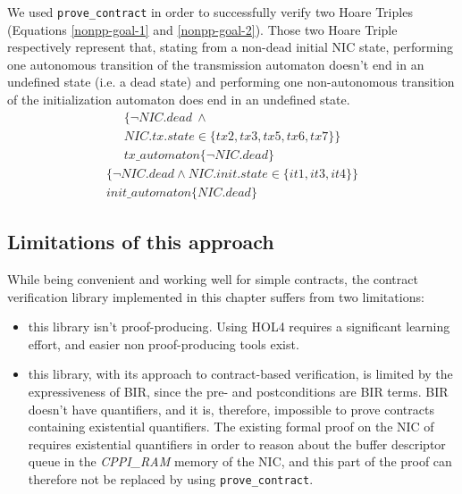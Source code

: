 \documentclass[10pt,a4paper]{article}
\begin{document}
\begin{multicols}{2}
We used \texttt{prove\_contract} in order to successfully verify two Hoare Triples (Equations \ref{nonpp-goal-1} and \ref{nonpp-goal-2}). Those two Hoare Triple respectively represent that, stating from a non-dead initial NIC state, performing one autonomous transition of the transmission automaton doesn't end in an undefined state (i.e. a dead state) and performing one non-autonomous transition of the initialization automaton does end in an undefined state.
\begin{multline}
  \{\neg NIC.dead~\land\\
  NIC.tx.state \in \{tx2,tx3,tx5,tx6,tx7\}\}\\
	tx\_automaton\{\neg NIC.dead\}
    \label{nonpp-goal-1}
\end{multline}
\begin{multline}
	\{\neg NIC.dead \land NIC.init.state \in \{it1,it3,it4\}\}\\
	init\_automaton\{NIC.dead\}
    \label{nonpp-goal-2}
\end{multline}

\subsection{Limitations of this approach}

While being convenient and working well for simple contracts, the contract verification library implemented in this chapter suffers from two limitations:

\begin{itemize}
  \item this library isn't {proof-producing}. Using HOL4 requires a significant learning effort, and easier non proof-producing tools exist.
	\item this library, with its approach to contract-based verification, is limited by the expressiveness of BIR, since the pre- and postconditions are BIR terms. BIR doesn't have quantifiers, and it is, therefore, impossible to prove contracts containing existential quantifiers. The existing formal proof on the NIC of \cite{haglund_formal_2016} requires existential quantifiers in order to reason about the buffer descriptor queue in the \textit{CPPI\_RAM} memory of the NIC, and this part of the proof can therefore not be replaced by using \texttt{prove\_contract}.
\end{itemize}


\end{multicols}
\end{document}
